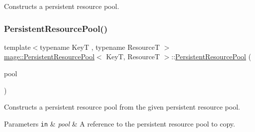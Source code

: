 Constructs a persistent resource pool. \hypertarget{classmage_1_1_persistent_resource_pool_af49749cabca4e6e16b2c073f6f550e0b}{}\label{classmage_1_1_persistent_resource_pool_af49749cabca4e6e16b2c073f6f550e0b} 
\subsubsection{\texorpdfstring{Persistent\+Resource\+Pool()}{PersistentResourcePool()}\hspace{0.1cm}{\footnotesize\ttfamily [2/3]}}
{\footnotesize\ttfamily template$<$typename KeyT , typename ResourceT $>$ \\
\hyperlink{classmage_1_1_persistent_resource_pool}{mage\+::\+Persistent\+Resource\+Pool}$<$ KeyT, ResourceT $>$\+::\hyperlink{classmage_1_1_persistent_resource_pool}{Persistent\+Resource\+Pool} (\begin{DoxyParamCaption}\item[{const \hyperlink{classmage_1_1_persistent_resource_pool}{Persistent\+Resource\+Pool}$<$ KeyT, ResourceT $>$ \&}]{pool }\end{DoxyParamCaption})\hspace{0.3cm}{\ttfamily [delete]}}

Constructs a persistent resource pool from the given persistent resource pool.


\begin{DoxyParams}[1]{Parameters}
\mbox{\tt in}  & {\em pool} & A reference to the persistent resource pool to copy. \\
\hline
\end{DoxyParams}
\hypertarget{classmage_1_1_persistent_resource_pool_acf26c05e2e6031720fa92fb0cec0d398}{}\label{classmage_1_1_persistent_resource_pool_acf26c05e2e6031720fa92fb0cec0d398} 
